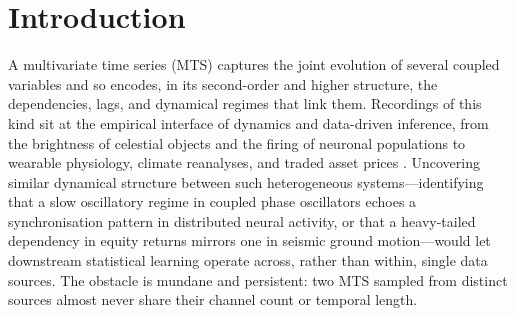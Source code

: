 \documentclass{article}
\theoremstyle{plain}
\theoremstyle{definition}
\theoremstyle{remark}
\begin{document}

\printAffiliationsAndNotice{\icmlEqualContribution}

\section{Introduction}
\label{sec:intro}

A multivariate time series (MTS) captures the joint evolution of several coupled variables and so encodes, in its second-order and higher structure, the dependencies, lags, and dynamical regimes that link them. Recordings of this kind sit at the empirical interface of dynamics and data-driven inference, from the brightness of celestial objects and the firing of neuronal populations to wearable physiology, climate reanalyses, and traded asset prices \citep{reinsel2003multivariate,bassett2017network,stephens2008dimensionality}. Uncovering similar dynamical structure between such heterogeneous systems---identifying that a slow oscillatory regime in coupled phase oscillators echoes a synchronisation pattern in distributed neural activity, or that a heavy-tailed dependency in equity returns mirrors one in seismic ground motion---would let downstream statistical learning operate across, rather than within, single data sources. The obstacle is mundane and persistent: two MTS sampled from distinct sources almost never share their channel count or temporal length.
\end{document}

